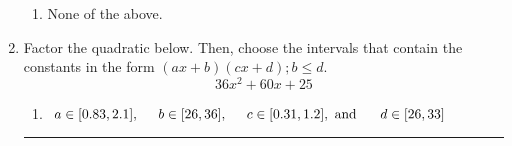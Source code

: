 \documentclass[14pt]{extbook}
\newcommand{\litem}[1]{\item#1\hspace*{-1cm}\rule{\textwidth}{0.4pt}}
\begin{document}
\begin{enumerate}
{\begin{enumerate}[label=\Alph*.]
\item None of the above.
\end{enumerate} }
\litem{
Factor the quadratic below. Then, choose the intervals that contain the constants in the form $(ax+b)(cx+d); b \leq d.$\[ 36x^{2} +60 x + 25 \]\begin{enumerate}[label=\Alph*.]
\item \( a \in [0.83, 2.1], \hspace*{5mm} b \in [26, 36], \hspace*{5mm} c \in [0.31, 1.2], \text{ and } \hspace*{5mm} d \in [26, 33] \)

\end{enumerate}}
\end{enumerate}
\end{document}

